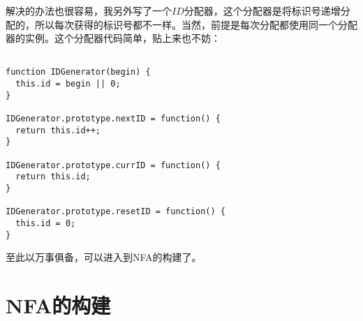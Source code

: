 解决的办法也很容易，我另外写了一个$ID$分配器，这个分配器是将标识号递增分配的，所以每次获得的标识号都不一样。当然，前提是每次分配都使用同一个分配器的实例。这个分配器代码简单，贴上来也不妨：

\begin{verbatim}

function IDGenerator(begin) {
  this.id = begin || 0;
}

IDGenerator.prototype.nextID = function() {
  return this.id++;
} 

IDGenerator.prototype.currID = function() {
  return this.id;
} 

IDGenerator.prototype.resetID = function() {
  this.id = 0;
}

\end{verbatim}

至此以万事俱备，可以进入到NFA的构建了。

\section{NFA的构建}
